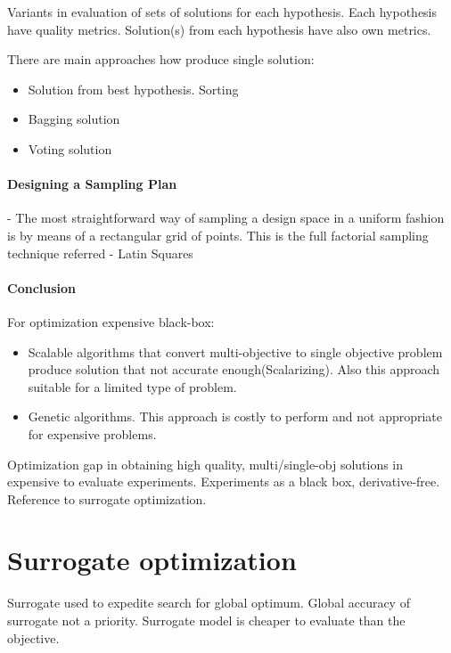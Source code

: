             Variants in evaluation of sets of solutions for each hypothesis.
            Each hypothesis have quality metrics. Solution(s) from each hypothesis have also own metrics.
        
            There are main approaches how produce single solution: 
            \begin{itemize}
                \item Solution from best hypothesis. Sorting
                \item Bagging solution
                \item Voting solution                
            \end{itemize}
        
            \paragraph{Designing a Sampling Plan}
             - The most straightforward way of sampling a design space in a uniform fashion is by \cite{EngSurMod}
             means of a rectangular grid of points. This is the full factorial sampling technique referred
             - Latin Squares

        \paragraph{Conclusion}
        For optimization expensive black-box:
        \begin{itemize}
            \item Scalable algorithms that convert multi-objective to single objective problem produce solution that not accurate enough(Scalarizing). Also this approach suitable for a limited type of problem.
            \item Genetic algorithms. This approach is costly to perform and not appropriate for expensive problems.
        \end{itemize}
        Optimization gap in obtaining high quality, multi/single-obj solutions in expensive to evaluate experiments.
        Experiments as a black box, derivative-free. Reference to surrogate optimization.

    \section{Surrogate optimization}
        Surrogate used to expedite search for global optimum. Global accuracy of surrogate
        not a priority. Surrogate model is cheaper to evaluate than the objective.

